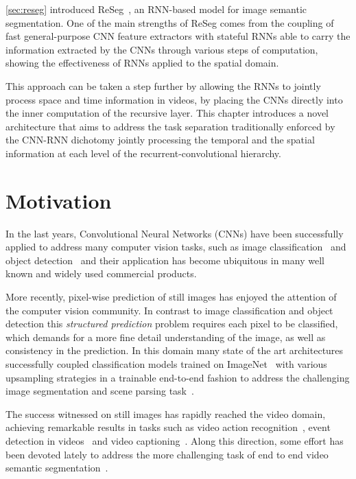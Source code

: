 \autoref{sec:reseg} introduced ReSeg~\citep{Visin_2016_CVPR_Workshops}, an
RNN-based model for image semantic segmentation. One of the main strengths of
ReSeg comes from the coupling of fast general-purpose CNN feature extractors
with stateful RNNs able to carry the information extracted by the CNNs through
various steps of computation, showing the effectiveness of RNNs applied to the
spatial domain.

This approach can be taken a step further by allowing the RNNs to jointly
process space and time information in videos, by placing the CNNs directly into
the inner computation of the recursive layer. This chapter introduces a novel
architecture that aims to address the task separation traditionally enforced by
the CNN-RNN dichotomy jointly processing the temporal and the spatial
information at each level of the recurrent-convolutional hierarchy.


\section{Motivation}

In the last years, Convolutional Neural Networks (CNNs) have been successfully
applied to address many computer vision tasks, such as image
classification~\citep{Krizhevsky2012-alexnet,Simonyan2015,
Szegedy-et-al-arxiv2014} and object detection~\citep{Girshick-et-al-arxiv2013,
Sermanet13overfeat} and their application has become ubiquitous in many well
known and widely used commercial products.

More recently, pixel-wise prediction of still images has enjoyed the attention
of the computer vision community. In contrast to image classification and
object detection this \emph{structured prediction} problem requires each
pixel to be classified, which demands for a more fine detail understanding of
the image, as well as consistency in the prediction. In this domain many
state of the art architectures successfully coupled classification models
trained on ImageNet~\citep{Simonyan14vgg,Szegedy15googlelenet} with various
upsampling strategies in a trainable end-to-end fashion to address the
challenging image segmentation and scene parsing task~\citep[see e.g.,~][]{
long2014fully,noh2015learning}.

The success witnessed on still images has rapidly reached the video domain,
achieving remarkable results in tasks such as video action recognition~\citep{
simonyan2014two,karpathy2014large}, event detection in videos~\citep{
yeung2015end} and video captioning~\citep{yao2015describing}. Along this
direction, some effort has been devoted lately to address the more
challenging task of end to end video semantic segmentation~\citep{Tran16v2v}.

